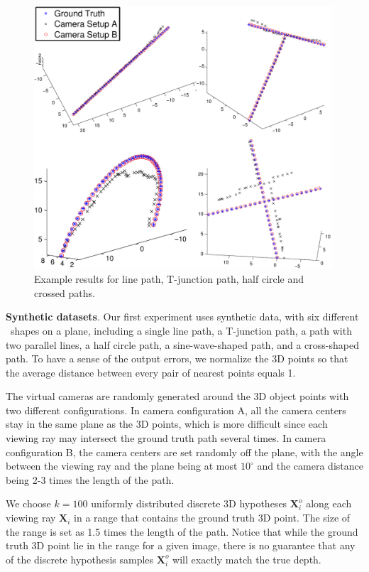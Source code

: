\begin{figure}
\centering
    \includegraphics[width=0.99\textwidth]{chapter4/resource/allfig_2.pdf}
\caption[Example output of JOST on synthetic data]{Example results for line path, T-junction path, half circle and crossed paths.}
\label{fig:synthetic}
\end{figure}

\textbf{Synthetic datasets}. Our first experiment uses synthetic data, with six different \oct~shapes on a plane, including a single line path, a T-junction path, a path with two parallel lines, a half circle path, a sine-wave-shaped path, and a cross-shaped path. To have a sense of the output errors, we normalize the 3D points so that the average distance between every pair of nearest points equals 1.  

The virtual cameras are randomly generated around the 3D object points with two different configurations. In camera configuration A, all the camera centers stay in the same plane as the 3D points, which is more difficult since each viewing ray may intersect the ground truth path several times. In camera configuration B, the camera centers are set randomly off the plane, with the angle between the viewing ray and the plane being at most $10^\circ$ and the camera distance being 2-3 times the length of the path. 

We choose $k=100$ uniformly distributed discrete 3D hypotheses $\mathbf{X}_i^o$  along each viewing ray $\mathbf{X}_i$ in a range that contains the ground truth 3D point. The size of the range is set as 1.5 times the length of the path. Notice that while the ground truth 3D point lie in the range for a given image, there is no guarantee that any of the discrete hypothesis samples $\mathbf{X}_i^o$ will exactly match the true depth. 

